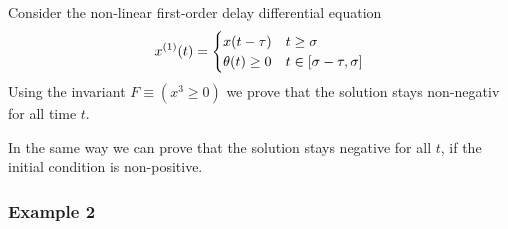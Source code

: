 \documentclass[10pt]{report}
\begin{document}
            Consider the non-linear first-order delay differential equation
            \begin{equation}
                \D{x}(t) = \begin{cases}
                     x(t-\tau) & t \geq \sigma\\
                     \theta(t)\geq 0 & t \in [\sigma-\tau,\sigma]
                \end{cases}
            \end{equation}
            Using the invariant $F\equiv(x^3\geq 0)$ we prove that the solution stays non-negativ for all time $t$.
            \begin{sequentdeduction}
            \end{sequentdeduction}
            In the same way we can prove that the solution stays negative for all $t$, if the initial condition is non-positive.

        \subsubsection{Example 2}
            \label{sec:ddi-example-2}
\end{document}
